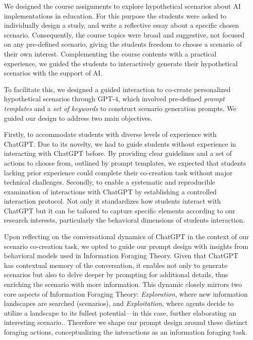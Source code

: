 \documentclass[sn-mathphys, Numbered]{sn-jnl}%
\theoremstyle{thmstyleone}%
\theoremstyle{thmstyletwo}%
\theoremstyle{thmstylethree}%
\begin{document}
We designed the course assignments to explore hypothetical scenarios about AI implementations in education. For this purpose the students were asked to individually design a study, and write a reflective essay about a specific chosen scenario. Consequently, the course topics were broad and suggestive, not focused on any pre-defined scenario, giving the students freedom to choose a scenario of their own interest. 
Complementing the course contents with a practical experience, we guided the students to interactively generate their hypothetical scenarios with the support of AI. 


To facilitate this, we designed a guided interaction to co-create personalized hypothetical scenarios through GPT-4, which involved pre-defined \textit{prompt templates} and a \textit{set of keywords} to construct scenario generation prompts. We guided our design to address two main objectives.

Firstly, to accommodate students with diverse levels of experience with ChatGPT. Due to its novelty, we had to guide students without experience in interacting with ChatGPT before. By providing clear guidelines and a set of actions to choose from, outlined by prompt templates, we expected that students lacking prior experience could complete their co-creation task without major technical challenges.
Secondly, to enable a systematic and reproducible examination of interactions with ChatGPT by establishing a controlled interaction protocol. Not only it standardizes how students interact with ChatGPT but it can be tailored to capture specific elements according to our research interests, particularly the behavioral dimensions of students interaction.

Upon reflecting on the conversational dynamics of ChatGPT in the context of our scenario co-creation task, we opted to guide our prompt design with insights from behavioral models used in Information Foraging Theory. Given that ChatGPT has contextual memory of the conversation, it enables not only to generate scenarios but also to delve deeper by prompting for additional details, thus enriching the scenario with more information. This dynamic closely mirrors two core aspects of Information Foraging Theory: \textit{Exploration}, where new information landscapes are searched (scenarios), and \textit{Exploitation}, where agents decide to utilize a landscape to its fullest potential---in this case, further elaborating an interesting scenario.\parencite{todd_foraging_2020,hills_exploration_2015,cohen_should_2007}. Therefore we shape our prompt design around these distinct foraging actions, conceptualizing the interactions as an information foraging task.
\end{document}
